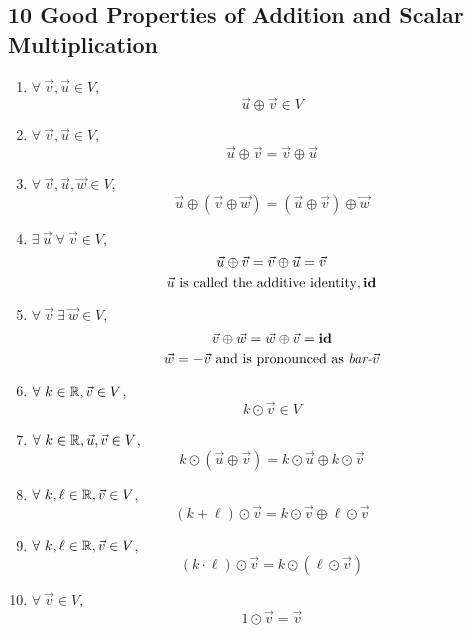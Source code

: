 \subsection*{10 Good Properties of Addition and Scalar Multiplication}
\begin{enumerate}
  \item {} $\forall~\vec{v}, \vec{u} \in V$,
        \[
          \vec{u} \oplus \vec{v} \in V
        \]
  \item {} $\forall~\vec{v}, \vec{u} \in V$,
        \[
          \vec{u} \oplus \vec{v} = \vec{v} \oplus \vec{u}
        \]
  \item {} $\forall~\vec{v}, \vec{u}, \vec{w} \in V$,
        \[
          \vec{u} \oplus (\vec{v} \oplus \vec{w}) = (\vec{u} \oplus \vec{v}) \oplus \vec{w}
        \]
  \item {} $\exists~\vec{u}~\forall~\vec{v} \in V$,
        \[
          \vec{u} \oplus \vec{v} = \vec{v} \oplus \vec{u} = \vec{v} \\
        \]
        \[
          \vec{u}~\text{is called the additive identity}, \operatorname{\textbf{id}}
        \]
  \item {} $\forall~\vec{v}~\exists~\vec{w} \in V$,
        \[
          \vec{v} \oplus \vec{w} = \vec{w} \oplus \vec{v} = \operatorname{\textbf{id}}
        \]
        \[
          \vec{w} = -\vec{v}~\text{and is pronounced as \textit{bar-$\vec{v}$}}
        \]
  \item {} $\forall~k \in \mathbb{R}, \vec{v} \in V$,
        \[
          k \odot \vec{v} \in V
        \]
  \item {} $\forall~k \in \mathbb{R}, \vec{u}, \vec{v} \in V$,
        \[
          k \odot (\vec{u} \oplus \vec{v}) = k \odot \vec{u} \oplus k \odot \vec{v}
        \]
  \item {} $\forall~k, \ell \in \mathbb{R}, \vec{v} \in V$,
        \[
          (k + \ell) \odot \vec{v} = k \odot \vec{v} \oplus \ell \odot \vec{v}
        \]
  \item {} $\forall~k, \ell \in \mathbb{R}, \vec{v} \in V$,
        \[
          (k \cdot \ell) \odot \vec{v} = k \odot (\ell \odot \vec{v})
        \]
  \item {} $\forall~\vec{v} \in V$,
        \[
          1 \odot \vec{v} = \vec{v}
        \]
\end{enumerate}
